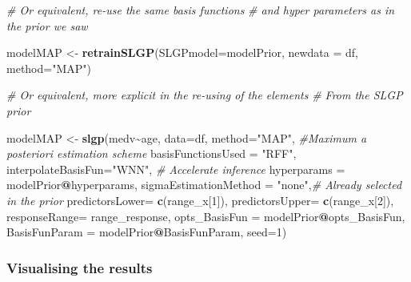\documentclass[
]{article}
\newenvironment{Shaded}{\begin{snugshade}}{\end{snugshade}}
\newcommand{\AttributeTok}[1]{\textcolor[rgb]{0.13,0.29,0.53}{#1}}
\newcommand{\CommentTok}[1]{\textcolor[rgb]{0.56,0.35,0.01}{\textit{#1}}}
\newcommand{\DecValTok}[1]{\textcolor[rgb]{0.00,0.00,0.81}{#1}}
\newcommand{\FunctionTok}[1]{\textcolor[rgb]{0.13,0.29,0.53}{\textbf{#1}}}
\newcommand{\NormalTok}[1]{#1}
\newcommand{\OtherTok}[1]{\textcolor[rgb]{0.56,0.35,0.01}{#1}}
\newcommand{\SpecialCharTok}[1]{\textcolor[rgb]{0.81,0.36,0.00}{\textbf{#1}}}
\newcommand{\StringTok}[1]{\textcolor[rgb]{0.31,0.60,0.02}{#1}}
\begin{document}
\begin{Shaded}
\begin{Highlighting}[]
\CommentTok{\# Or equivalent, re{-}use the same basis functions }
\CommentTok{\# and hyper parameters as in the prior we saw}

\NormalTok{modelMAP }\OtherTok{\textless{}{-}} \FunctionTok{retrainSLGP}\NormalTok{(}\AttributeTok{SLGPmodel=}\NormalTok{modelPrior, }
                        \AttributeTok{newdata =}\NormalTok{ df, }
                        \AttributeTok{method=}\StringTok{"MAP"}\NormalTok{)}
\end{Highlighting}
\end{Shaded}

\begin{Shaded}
\begin{Highlighting}[]
\CommentTok{\# Or equivalent, more explicit in the re{-}using of the elements}
\CommentTok{\# From the SLGP prior}

\NormalTok{modelMAP }\OtherTok{\textless{}{-}} \FunctionTok{slgp}\NormalTok{(medv}\SpecialCharTok{\textasciitilde{}}\NormalTok{age, }
                 \AttributeTok{data=}\NormalTok{df,}
                 \AttributeTok{method=}\StringTok{"MAP"}\NormalTok{, }\CommentTok{\#Maximum a posteriori estimation scheme}
                 \AttributeTok{basisFunctionsUsed =} \StringTok{"RFF"}\NormalTok{,}
                 \AttributeTok{interpolateBasisFun=}\StringTok{"WNN"}\NormalTok{, }\CommentTok{\# Accelerate inference}
                 \AttributeTok{hyperparams =}\NormalTok{ modelPrior}\SpecialCharTok{@}\NormalTok{hyperparams, }
                 \AttributeTok{sigmaEstimationMethod =} \StringTok{"none"}\NormalTok{,}\CommentTok{\# Already selected in the prior}
                 \AttributeTok{predictorsLower=} \FunctionTok{c}\NormalTok{(range\_x[}\DecValTok{1}\NormalTok{]),}
                 \AttributeTok{predictorsUpper=} \FunctionTok{c}\NormalTok{(range\_x[}\DecValTok{2}\NormalTok{]),}
                 \AttributeTok{responseRange=}\NormalTok{ range\_response,}
                 \AttributeTok{opts\_BasisFun =}\NormalTok{ modelPrior}\SpecialCharTok{@}\NormalTok{opts\_BasisFun,}
                 \AttributeTok{BasisFunParam =}\NormalTok{ modelPrior}\SpecialCharTok{@}\NormalTok{BasisFunParam,}
                 \AttributeTok{seed=}\DecValTok{1}\NormalTok{)}
\end{Highlighting}
\end{Shaded}

\subsubsection{Visualising the results}\label{visualising-the-results}
\end{document}
